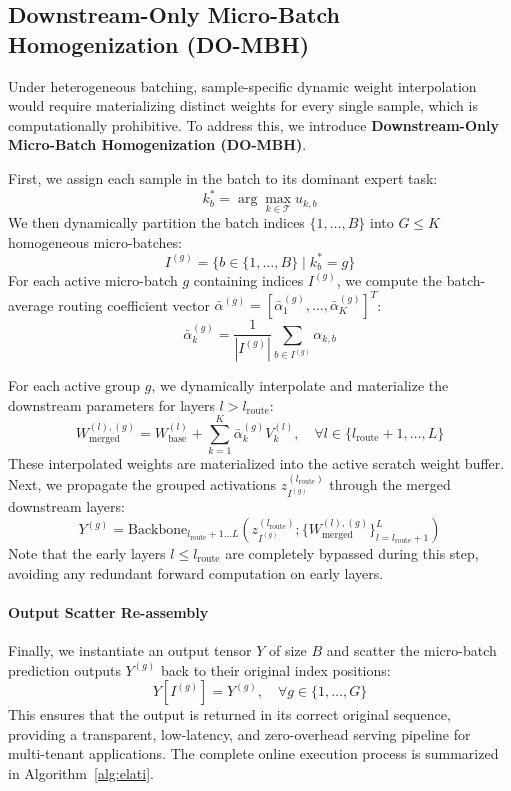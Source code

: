 \subsection{Downstream-Only Micro-Batch Homogenization (DO-MBH)}
Under heterogeneous batching, sample-specific dynamic weight interpolation would require materializing distinct weights for every single sample, which is computationally prohibitive.
To address this, we introduce \textbf{Downstream-Only Micro-Batch Homogenization (DO-MBH)}.

First, we assign each sample in the batch to its dominant expert task:
\begin{equation}
    k_b^* = \arg\max_{k \in \mathcal{T}} u_{k, b}
\end{equation}
We then dynamically partition the batch indices $\{1, \dots, B\}$ into $G \le K$ homogeneous micro-batches:
\begin{equation}
    I^{(g)} = \{b \in \{1, \dots, B\} \mid k_b^* = g\}
\end{equation}
For each active micro-batch $g$ containing indices $I^{(g)}$, we compute the batch-average routing coefficient vector $\bar{\alpha}^{(g)} = [\bar{\alpha}_1^{(g)}, \dots, \bar{\alpha}_K^{(g)}]^T$:
\begin{equation}
    \bar{\alpha}_k^{(g)} = \frac{1}{|I^{(g)}|} \sum_{b \in I^{(g)}} \alpha_{k, b}
\end{equation}

For each active group $g$, we dynamically interpolate and materialize the downstream parameters for layers $l > l_{\text{route}}$:
\begin{equation}
    W_{\text{merged}}^{(l), (g)} = W_{\text{base}}^{(l)} + \sum_{k=1}^K \bar{\alpha}_k^{(g)} V_k^{(l)}, \quad \forall l \in \{l_{\text{route}}+1, \dots, L\}
\end{equation}
These interpolated weights are materialized into the active scratch weight buffer.
Next, we propagate the grouped activations $z_{I^{(g)}}^{(l_{\text{route}})}$ through the merged downstream layers:
\begin{equation}
    Y^{(g)} = \text{Backbone}_{l_{\text{route}}+1 \dots L}\left( z_{I^{(g)}}^{(l_{\text{route}})}; \{W_{\text{merged}}^{(l), (g)}\}_{l=l_{\text{route}}+1}^L \right)
\end{equation}
Note that the early layers $l \le l_{\text{route}}$ are completely bypassed during this step, avoiding any redundant forward computation on early layers.

\paragraph{Output Scatter Re-assembly}
Finally, we instantiate an output tensor $Y$ of size $B$ and scatter the micro-batch prediction outputs $Y^{(g)}$ back to their original index positions:
\begin{equation}
    Y[I^{(g)}] = Y^{(g)}, \quad \forall g \in \{1, \dots, G\}
\end{equation}
This ensures that the output is returned in its correct original sequence, providing a transparent, low-latency, and zero-overhead serving pipeline for multi-tenant applications.
The complete online execution process is summarized in Algorithm~\ref{alg:elati}.

